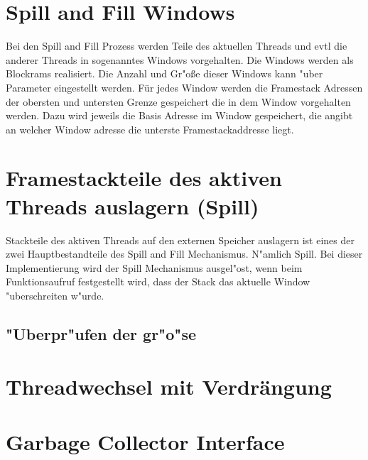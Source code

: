 \section{Spill and Fill Windows}

Bei den Spill and Fill Prozess werden Teile des aktuellen Threads  und evtl die anderer Threads in sogenanntes Windows vorgehalten. Die Windows werden als Blockrams realisiert. 
Die Anzahl und Gr"oße dieser Windows kann "uber Parameter eingestellt werden. Für jedes Window werden die Framestack Adressen der obersten und untersten Grenze gespeichert die in dem Window vorgehalten werden. Dazu wird jeweils die Basis Adresse im Window gespeichert, die angibt an welcher Window adresse die unterste Framestackaddresse liegt. 


\section{Framestackteile des aktiven Threads auslagern (Spill)}

Stackteile des aktiven Threads auf den externen Speicher auslagern ist eines der zwei Hauptbestandteile des Spill and Fill Mechanismus. N"amlich Spill. Bei dieser Implementierung wird der Spill Mechanismus ausgel"ost, wenn beim Funktionsaufruf festgestellt wird, dass der Stack das aktuelle Window "uberschreiten w"urde.

\subsection{"Uberpr"ufen der gr"o"se}


\section{Threadwechsel mit Verdr\"angung}

\section{Garbage Collector Interface}